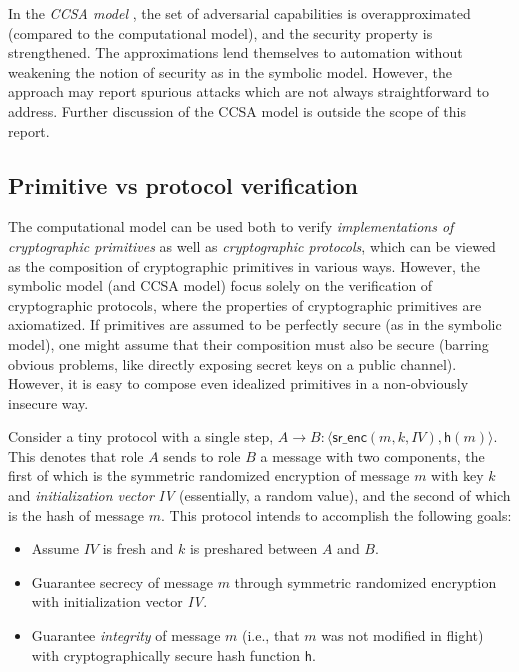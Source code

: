 \documentclass{article}
\theoremstyle{definition}
\begin{document}
In the \textit{CCSA model} \cite{ccsa}, the set of adversarial capabilities is overapproximated 
(compared to the computational model), and the security property is strengthened. 
The approximations lend themselves to automation without weakening the notion of security as in the symbolic model. 
However, the approach may report spurious attacks which are not always straightforward to address. 
Further discussion of the CCSA model is outside the scope of this report. 

\subsection{Primitive vs protocol verification} 
The computational model can be used both to verify \textit{implementations of cryptographic primitives} as well as 
\textit{cryptographic protocols}, which can be viewed as the composition of cryptographic primitives in various ways.
However, the symbolic model (and CCSA model) focus solely on the verification of cryptographic protocols, 
where the properties of cryptographic primitives are axiomatized.
If primitives are assumed to be perfectly secure (as in the symbolic model), 
one might assume that their composition must also be secure (barring obvious problems, 
like directly exposing secret keys on a public channel). 
However, it is easy to compose even idealized primitives in a non-obviously insecure way. 

Consider a tiny protocol with a single step, $A \rightarrow B: \langle \textsf{sr\_enc}(m, k, \textit{IV}), \textsf{h}(m) \rangle$. 
This denotes that role $A$ sends to role $B$ a message with two components, 
the first of which is the symmetric randomized encryption of message $m$ with key $k$ and 
\emph{initialization vector} \emph{IV} (essentially, a random value), 
and the second of which is the hash of message $m$. This protocol intends to accomplish the following goals:
\begin{itemize}
    \item[] Assume $\mathit{IV}$ is fresh and $k$ is preshared between $A$ and $B$.
    \item[(1)] Guarantee secrecy of message $m$ through symmetric randomized encryption with 
    initialization vector \textit{IV}.
    \item[(2)] Guarantee \emph{integrity} of message $m$ (i.e., that $m$ was not modified in flight) 
    with cryptographically secure hash function $\mathsf{h}$.
\end{itemize}
\end{document}
